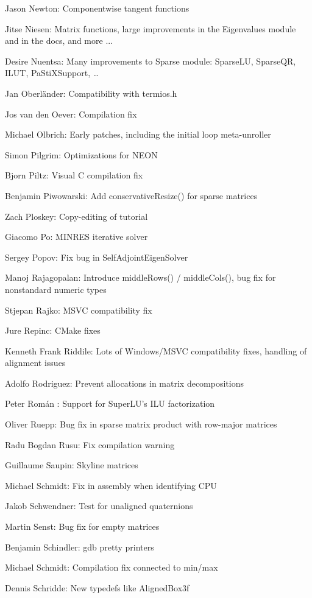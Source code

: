 Jason Newton:  Componentwise tangent functions  

Jitse Niesen:  Matrix functions, large improvements in the Eigenvalues module and in the docs, and more ...  

Desire Nuentsa:  Many improvements to Sparse module: SparseLU, SparseQR, ILUT, PaStiXSupport, …  

Jan Oberländer:  Compatibility with termios.h  

Jos van den Oever:  Compilation fix  

Michael Olbrich:  Early patches, including the initial loop meta-unroller  

Simon Pilgrim:  Optimizations for NEON  

Bjorn Piltz:  Visual C compilation fix  

Benjamin Piwowarski:  Add conservativeResize() for sparse matrices  

Zach Ploskey:  Copy-editing of tutorial  

Giacomo Po:  MINRES iterative solver  

Sergey Popov:  Fix bug in SelfAdjointEigenSolver  

Manoj Rajagopalan:  Introduce middleRows() / middleCols(), bug fix for nonstandard numeric types  

Stjepan Rajko:  MSVC compatibility fix  

Jure Repinc:  CMake fixes  

Kenneth Frank Riddile:  Lots of Windows/MSVC compatibility fixes, handling of alignment issues  

Adolfo Rodriguez:  Prevent allocations in matrix decompositions  

Peter Román : Support for SuperLU's ILU factorization  

Oliver Ruepp:  Bug fix in sparse matrix product with row-major matrices  

Radu Bogdan Rusu:  Fix compilation warning  

Guillaume Saupin:  Skyline matrices  

Michael Schmidt:  Fix in assembly when identifying CPU  

Jakob Schwendner:  Test for unaligned quaternions  

Martin Senst:  Bug fix for empty matrices  

Benjamin Schindler:  gdb pretty printers  

Michael Schmidt:  Compilation fix connected to min/max  

Dennis Schridde:  New typedefs like AlignedBox3f  

